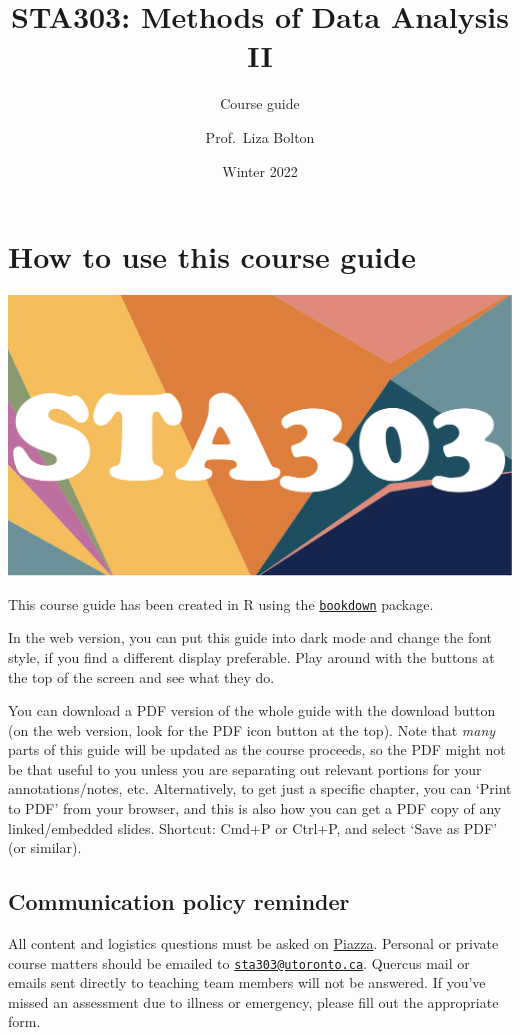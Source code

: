 \documentclass[
  openany]{book}
\title{STA303: Methods of Data Analysis II}
\subtitle{Course guide}
\author{Prof.~Liza Bolton}
\date{Winter 2022}
\begin{document}
\maketitle

{
\hypersetup{linkcolor=}
\setcounter{tocdepth}{1}
\tableofcontents
}
\hypertarget{how-to-use-this-course-guide}{%
\chapter{How to use this course guide}\label{how-to-use-this-course-guide}}

\begin{center}\includegraphics[width=0.5\linewidth]{images/quercus-cover} \end{center}

This course guide has been created in R using the \href{https://bookdown.org/}{\texttt{bookdown}} package.

In the web version, you can put this guide into dark mode and change the font style, if you find a different display preferable. Play around with the buttons at the top of the screen and see what they do.

You can download a PDF version of the whole guide with the download button (on the web version, look for the PDF icon button at the top). Note that \emph{many} parts of this guide will be updated as the course proceeds, so the PDF might not be that useful to you unless you are separating out relevant portions for your annotations/notes, etc. Alternatively, to get just a specific chapter, you can `Print to PDF' from your browser, and this is also how you can get a PDF copy of any linked/embedded slides. Shortcut: Cmd+P or Ctrl+P, and select `Save as PDF' (or similar).

\hypertarget{communication-policy-reminder}{%
\section{Communication policy reminder}\label{communication-policy-reminder}}

All content and logistics questions must be asked on \href{\%60r\%20piazza\%60}{Piazza}. Personal or private course matters should be emailed to \href{mailto:sta303@utoronto.ca}{\nolinkurl{sta303@utoronto.ca}}. Quercus mail or emails sent directly to teaching team members will not be answered. If you've missed an assessment due to illness or emergency, please fill out the appropriate form.
\end{document}
